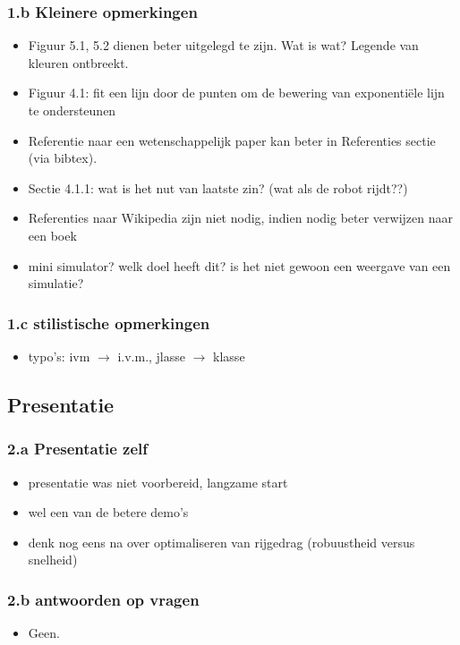 \documentclass[12pt,a4paper]{report}
\begin{document}
   \subsubsection{1.b Kleinere opmerkingen}

 
\begin{itemize}
 \item Figuur 5.1, 5.2 dienen beter uitgelegd te zijn. Wat is wat? Legende van kleuren ontbreekt. 
 \item Figuur 4.1: fit een lijn door de punten om de bewering van exponenti\"ele lijn te ondersteunen 
 \item Referentie naar een wetenschappelijk paper kan beter in Referenties sectie (via bibtex).
 \item Sectie 4.1.1: wat is het nut van laatste zin? (wat als de robot rijdt??)
 \item Referenties naar Wikipedia zijn niet nodig, indien nodig beter verwijzen naar een boek
 \item mini simulator? welk doel heeft dit? is het niet gewoon een weergave van een simulatie?
\end{itemize}

   \subsubsection{1.c stilistische opmerkingen}

\begin{itemize}
	\item typo's: ivm $\rightarrow$ i.v.m., jlasse $\rightarrow$ klasse
\end{itemize}

\subsection{Presentatie}

	\subsubsection{2.a Presentatie zelf}
\begin{itemize}
 \item presentatie was niet voorbereid, langzame start
 \item wel een van de betere demo's
 \item denk nog eens na over optimaliseren van rijgedrag (robuustheid versus snelheid)
\end{itemize}

     \subsubsection{2.b antwoorden op vragen}
\begin{itemize}
	\item     Geen.
 
\end{itemize}
\end{document}
